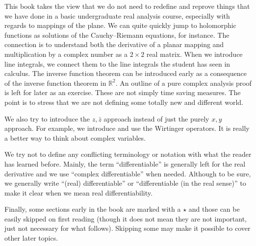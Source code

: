 \documentclass[12pt,openany]{book}
\newcommand{\R}{{\mathbb{R}}}
\newcommand{\myquote}[1]{``#1''}
\theoremstyle{plain}
\theoremstyle{remark}
\theoremstyle{definition}
\theoremstyle{exercise}
\theoremstyle{example}
\begin{document}
This book takes the view that we do not need to redefine and reprove
things that we have done in a basic undergraduate real analysis course,
especially with
regards to mappings of the plane.  We can quite quickly jump to
holomorphic functions as solutions of the Cauchy--Riemann equations,
for instance.
The connection is to understand both the derivative of 
a planar mapping and
multiplication by a complex number
as a $2 \times 2$ real matrix.
When we introduce line integrals, we connect
them to the line integrals the student has seen in calculus.
The inverse function theorem can be introduced early as
a consequence of the inverse function theorem in $\R^2$.
An outline of a pure complex analysis proof is left for later as an exercise.
These are not simply time saving measures.
The point is to stress that we are not defining some totally new and
different world.

We also try to introduce the $z,\bar{z}$ approach instead of just the
purely $x,y$ approach.  For example, we introduce and use the Wirtinger
operators.
It is really a better way to think about complex variables.

We try not to define any conflicting terminology or notation
with what the reader has learned before.
Mainly, the term \myquote{differentiable} is generally left for the real
derivative and we use \myquote{complex differentiable} when needed.  Although
to be sure, 
we generally write \myquote{(real) differentiable} or
\myquote{differentiable (in the real sense)} to
make it clear when we mean real differentiability.

Finally, some sections early in the book are marked with a $\star$ and those
can be easily skipped on first reading (though it does not mean they are not
important, just not necessary for what follows).  Skipping some may make it
possible to cover other later topics.

\medskip
\end{document}
